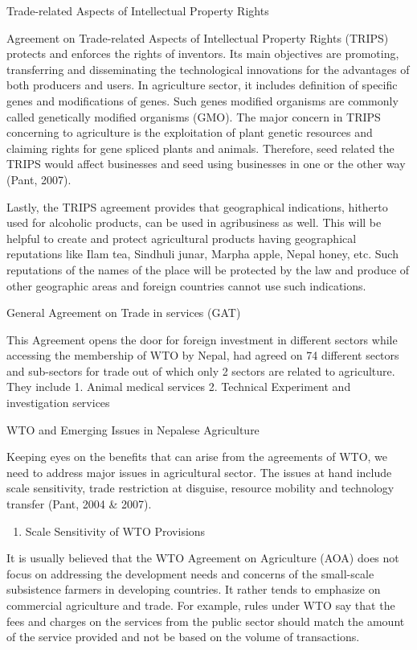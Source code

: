 \documentclass[
  openany]{book}
\providecommand{\tightlist}{%
  \setlength{\itemsep}{0pt}\setlength{\parskip}{0pt}}
\begin{document}
Trade-related Aspects of Intellectual Property Rights

Agreement on Trade-related Aspects of Intellectual Property Rights (TRIPS) protects and enforces the rights of inventors. Its main objectives are promoting, transferring and disseminating the technological innovations for the advantages of both producers and users. In agriculture sector, it includes definition of specific genes and modifications of genes. Such genes modified organisms are commonly called genetically modified organisms (GMO). The major concern in TRIPS concerning to agriculture is the exploitation of plant genetic resources and claiming rights for gene spliced plants and animals. Therefore, seed related the TRIPS would affect businesses and seed using businesses in one or the other way (Pant, 2007).

Lastly, the TRIPS agreement provides that geographical indications, hitherto used for alcoholic products, can be used in agribusiness as well. This will be helpful to create and protect agricultural products having geographical reputations like Ilam tea, Sindhuli junar, Marpha apple, Nepal honey, etc. Such reputations of the names of the place will be protected by the law and produce of other geographic areas and foreign countries cannot use such indications.

General Agreement on Trade in services (GAT)

This Agreement opens the door for foreign investment in different sectors while accessing the membership of WTO by Nepal, had agreed on 74 different sectors and sub-sectors for trade out of which only 2 sectors are related to agriculture. They include
1. Animal medical services
2. Technical Experiment and investigation services

WTO and Emerging Issues in Nepalese Agriculture

Keeping eyes on the benefits that can arise from the agreements of WTO, we need to address major issues in agricultural sector. The issues at hand include scale sensitivity, trade restriction at disguise, resource mobility and technology transfer (Pant, 2004 \& 2007).

\begin{enumerate}
\def\labelenumi{\arabic{enumi}.}
\tightlist
\item
  Scale Sensitivity of WTO Provisions
\end{enumerate}

It is usually believed that the WTO Agreement on Agriculture (AOA) does not focus on addressing the development needs and concerns of the small-scale subsistence farmers in developing countries. It rather tends to emphasize on commercial agriculture and trade. For example, rules under WTO say that the fees and charges on the services from the public sector should match the amount of the service provided and not be based on the volume of transactions.
\end{document}
